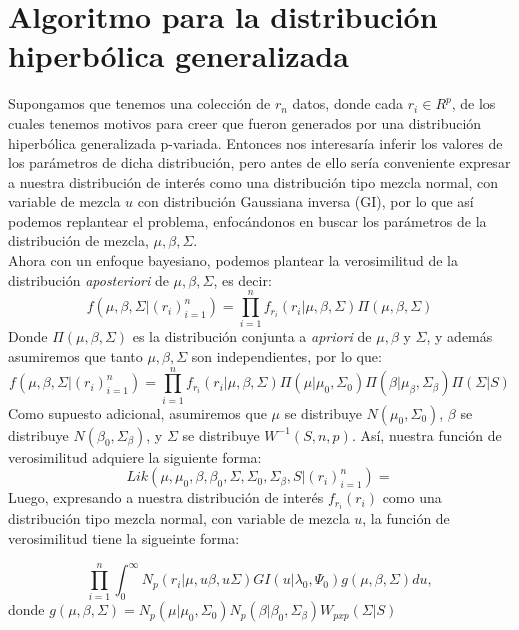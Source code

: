 \section{Algoritmo para la distribución hiperbólica generalizada}

Supongamos que tenemos una colección de $r_{n}$ datos, donde cada $r_{i}\in R^{p}$, de los cuales tenemos motivos para creer que fueron generados por una distribución hiperbólica generalizada p-variada. Entonces nos interesaría inferir los valores de los parámetros de dicha distribución, pero antes de ello sería conveniente expresar a nuestra distribución de interés como una distribución tipo mezcla normal, con variable de mezcla $u$ con distribución Gaussiana inversa (GI), por lo que así podemos replantear el problema, enfocándonos en buscar los parámetros de la distribución de mezcla, $\mu,\beta,\Sigma$.\\

Ahora con un enfoque bayesiano, podemos plantear la verosimilitud de la distribución \textit{aposteriori} de $\mu,\beta,\Sigma$, es decir:
\begin{equation*}
f(\mu,\beta,\Sigma|(r_{i})_{i=1}^{n})=\prod_{i=1}^{n}f_{r_{i}}(r_{i}|\mu,\beta,\Sigma)\Pi(\mu,\beta,\Sigma)
\end{equation*}   
Donde $\Pi(\mu,\beta,\Sigma)$ es la distribución conjunta a \textit{apriori} de $\mu,\beta$ y $\Sigma$, y además asumiremos que tanto $\mu,\beta,\Sigma$ son independientes, por lo que:
\begin{equation*}
f(\mu,\beta,\Sigma|(r_{i})_{i=1}^{n})=\prod_{i=1}^{n}f_{r_{i}}(r_{i}|\mu,\beta,\Sigma)\Pi(\mu|\mu_{0},\Sigma_{0})\Pi(\beta|\mu_{\beta},\Sigma_{\beta})\Pi(\Sigma|S)
\end{equation*}
 Como supuesto adicional, asumiremos que $\mu$ se distribuye $N(\mu_{0},\Sigma_{0})$, $\beta$ se distribuye $N(\beta_{0},\Sigma_{\beta})$, y $\Sigma$ se distribuye $W^{-1}(S,n,p)$. Así, nuestra función de verosimilitud adquiere la siguiente forma:
\begin{equation*}
Lik(\mu,\mu_{0},\beta,\beta_{0},\Sigma,\Sigma_{0},\Sigma_{\beta},S|(r_{i})_{i=1}^{n})=
\end{equation*}
Luego, expresando a nuestra distribución de interés $f_{r_{i}}(r_{i})$ como una distribución tipo mezcla normal, con variable de mezcla $u$, la función de verosimilitud tiene la sigueinte forma:
 
\begin{equation*}
\prod_{i=1}^{n}\int_{0}^{\infty}N_{p}(r_{i}|\mu,u\beta,u\Sigma)GI(u|\lambda_{0},\Psi_{0})g(\mu,\beta,\Sigma)du,
\end{equation*}
donde $g(\mu,\beta,\Sigma)=N_{p}(\mu|\mu_{0},\Sigma_{0})N_{p}(\beta|\beta_{0},\Sigma_{\beta})W_{pxp}(\Sigma|S)$

